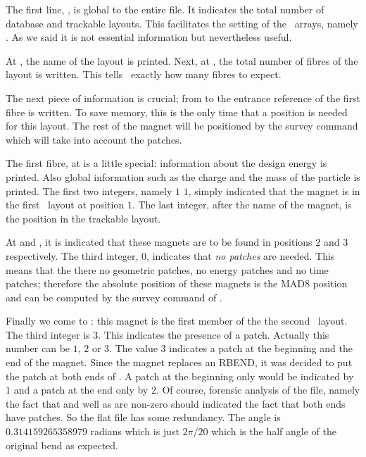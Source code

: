 The first line, ,  is  global to the entire file. It indicates the total number of database and trackable layouts. This facilitates the setting of the \DNA\ arrays, namely . As we said it is not essential information but nevertheless useful.

At , the name of the layout is printed. Next, at  , the total number of fibres of the layout is written. This tells \PTC\ exactly how many fibres to expect.

The next piece of information is crucial; from  to  the entrance reference of the first fibre is written. To save memory, this is the only time that a position is needed for this layout. The rest of the magnet will be positioned by the survey command which will take into account the patches. 


The first fibre, at   is a little special:  information about the design energy is printed. Also global information such as the charge and the mass of the particle is printed. The first two integers, namely $1 \, \, 1$, simply indicated that the magnet is in the  first \DNA\ layout at position $1$. The last integer, after the name of the magnet, is the position in the trackable layout.

At     and , it is indicated that these magnets are to be found in positions $2$ and $3$ respectively. The third  integer, $0$, indicates that \emph{no patches} are needed. This means that the there no geometric patches, no energy patches and no time patches; therefore the absolute position of these magnets is the MAD8 position and  can be computed by the survey command of \PTC .

Finally we come to : this magnet is the first member of the the second \DNA\ layout. The third integer is $3$. This  indicates the presence of a patch. Actually this number can be $1$, $2$ or $3$. The value $3$ indicates a patch at the beginning and the end of the magnet. Since the magnet  replaces an RBEND, it was decided to put the patch at both ends of . A patch at the beginning only would be indicated by $1$ and a patch at the end only by $2$. Of course, forensic analysis of the file, namely the fact that  and well as  are non-zero should indicated the fact that both ends have patches. So the flat file has some redundancy. The angle is $0.314159265358979$ radians which is just $2 \pi / 20 $ which is the half angle of the original bend as expected.

